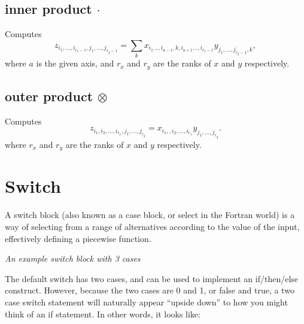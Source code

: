 \subsection{inner product $\cdot$}\label{Operation:innerProduct}
Computes
\begin{displaymath}
  z_{i_1,\ldots,i_{r_x-1},j_1,\ldots,j_{r_y-1}} =
  \sum_k x_{i_1\ldots,i_{a-1},k,i_{a+1}\ldots,i_{r_x-1}}
  y_{j_1,\ldots,j_{r_y-1},k},
\end{displaymath}
where $a$ is the given axis, and $r_x$ and $r_y$ are the ranks of $x$
and $y$ respectively.

\subsection{outer product $\otimes$}\label{Operation:outerProduct}
Computes
\begin{displaymath}
  z_{i_1,i_2,\ldots,i_{r_x},j_1,\ldots,j_{r_y}} =
  x_{i_1,,i_2,\ldots,i_{r_x}}y_{j_1,\ldots,j_{r_y}}.
\end{displaymath}
where $r_x$ and $r_y$ are the ranks of $x$ and $y$ respectively.

\section{Switch}\label{SwitchIcon}

 A switch block (also known as a case
block, or select in the Fortran world) is a way of selecting from a
range of alternatives according to the value of the input, effectively
defining a piecewise function.

\begin{center}
   {\em
    An example switch block with 3 cases}
\end{center}

The default switch has two cases, and can be used to implement an
if/then/else construct. However, because the two cases are 0 and 1, or
false and true, a two case switch statement will naturally appear
``upside down'' to how you might think of an if statement. In other
words, it looks like:

